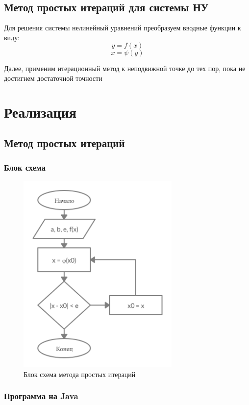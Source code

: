 \documentclass[11pt, english]{article}
\begin{document}
\subsection{Метод простых итераций для системы НУ}
Для решения системы нелинейный уравнений преобразуем вводные функции к виду:
$$y = f(x)$$
$$x = \psi(y)$$

Далее, применим итерационный метод к неподвижной точке до тех пор, пока не достигнем достаточной точности
\newpage
\section{Реализация}
\subsection{Метод простых итераций}
\subsubsection{Блок схема}
\begin{figure}[h!]
    \centering
    \includegraphics[width=8cm]{iterative-schema.jpg}
    \caption{Блок схема метода простых итераций}
    \label{fig:my_label}
\end{figure}
\newpage
\subsubsection{Программа на Java}
\end{document}
